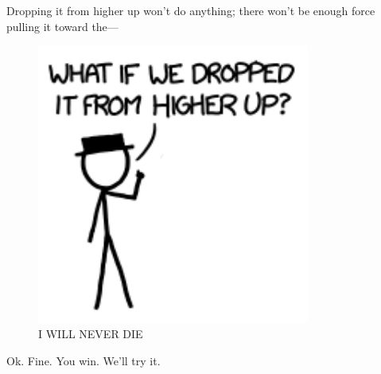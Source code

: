{{Dropping it from higher up won't do anything; there won't be enough force pulling it toward the—}

\begin{figure}[!htbp]
\centering
\includegraphics[scale=0.5, max width=0.8\textwidth]{imgs/a/57/mountain_hat.png}
\caption{I WILL NEVER DIE}
\end{figure}

{Ok. Fine. You win. We'll try it.}

}
